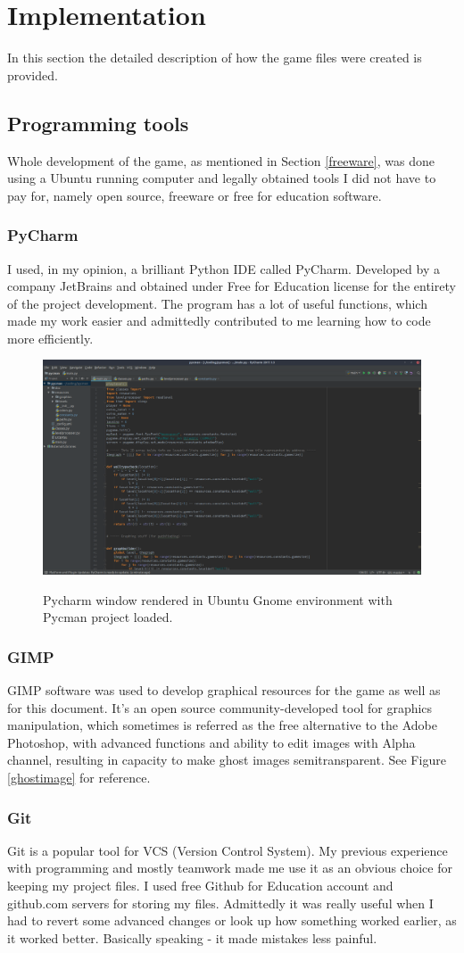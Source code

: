 \documentclass[11pt,a4paper,notitlepage]{report}
\newcommand{\dsubsection}[1]{\FloatBarrier \subsection{#1}}
\newenvironment{img}{
	\begin{center}
		\begin{figure}[H]
			\begin{center}
			
}{
	\end{center}
		\end{figure}
			\end{center}
}
\begin{document}
	\chapter{Implementation}
		In this section the detailed description of how the game files were created is provided.
		\section{Programming tools}
			Whole development of the game, as mentioned in Section \ref{freeware}, was done using a Ubuntu running computer and legally obtained tools I did not have to pay for, namely open source, freeware or free for education software.
			\dsubsection{PyCharm}
				I used, in my opinion, a brilliant Python IDE called PyCharm. Developed by a company JetBrains and obtained under Free for Education license for the entirety of the project development. The program has a lot of useful functions, which made my work easier and admittedly contributed to me learning how to code more efficiently.
				\begin{img}
					\includegraphics[width=350pt]{images/pycharm}\\
					\caption{Pycharm window rendered in Ubuntu Gnome environment with Pycman project loaded.}
				\end{img}
			\dsubsection{GIMP}
				GIMP software was used to develop graphical resources for the game as well as for this document. It's an open source community-developed tool for graphics manipulation, which sometimes is referred as the free alternative to the Adobe Photoshop, with advanced functions and ability to edit images with Alpha channel, resulting in capacity to make ghost images semitransparent. See Figure \ref{ghostimage} for reference.
			\dsubsection{Git}
				Git is a popular tool for VCS (Version Control System). My previous experience with programming and mostly teamwork made me use it as an obvious choice for keeping my project files. I used free Github for Education account and github.com servers for storing my files. Admittedly it was really useful when I had to revert some advanced changes or look up how something worked earlier, as it worked better. Basically speaking - it made mistakes less painful.
\end{document}
